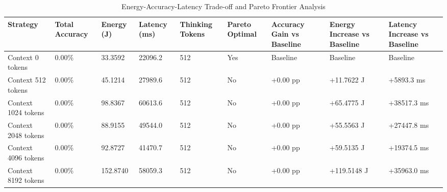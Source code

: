 \begin{table}
\caption{Energy-Accuracy-Latency Trade-off and Pareto Frontier Analysis}
\label{tab:tradeoff_comparison}
\begin{tabular}{lllllllll}
\toprule
Strategy & Total Accuracy & Energy (J) & Latency (ms) & Thinking Tokens & Pareto Optimal & Accuracy Gain vs Baseline & Energy Increase vs Baseline & Latency Increase vs Baseline \\
\midrule
Context 0 tokens & 0.00\% & 33.3592 & 22096.2 & 512 & Yes & Baseline & Baseline & Baseline \\
Context 512 tokens & 0.00\% & 45.1214 & 27989.6 & 512 & No & +0.00 pp & +11.7622 J & +5893.3 ms \\
Context 1024 tokens & 0.00\% & 98.8367 & 60613.6 & 512 & No & +0.00 pp & +65.4775 J & +38517.3 ms \\
Context 2048 tokens & 0.00\% & 88.9155 & 49544.0 & 512 & No & +0.00 pp & +55.5563 J & +27447.8 ms \\
Context 4096 tokens & 0.00\% & 92.8727 & 41470.7 & 512 & No & +0.00 pp & +59.5135 J & +19374.5 ms \\
Context 8192 tokens & 0.00\% & 152.8740 & 58059.3 & 512 & No & +0.00 pp & +119.5148 J & +35963.0 ms \\
\bottomrule
\end{tabular}
\end{table}
